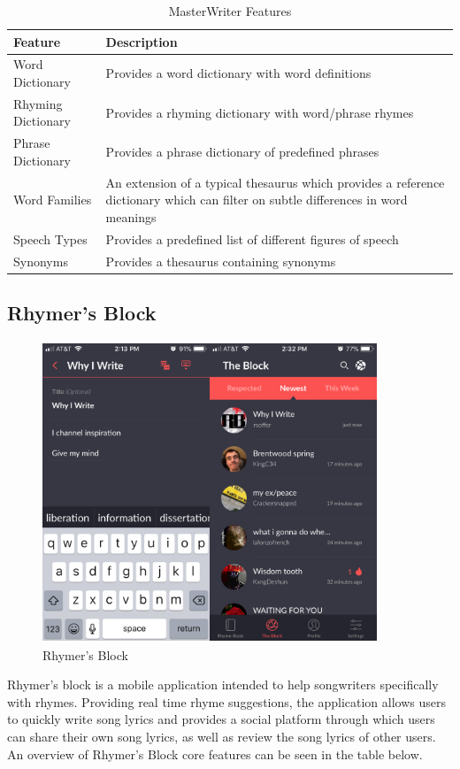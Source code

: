 \begin{table}[ht]
	\caption{MasterWriter Features}
	\centering
	\begin{tabular}{ | l | p{10cm} |}
		\hline
		\textbf{Feature} & \textbf{Description}\\ \hline
		Word Dictionary & Provides a word dictionary with word
		definitions \\ \hline
		Rhyming Dictionary & Provides a rhyming dictionary with
		word/phrase rhymes \\ \hline
		Phrase Dictionary & Provides a phrase dictionary of predefined
		phrases \\ \hline
		Word Families & An extension of a typical thesaurus which
		provides a reference dictionary which can
		filter on subtle differences in word
		meanings \\ \hline
		Speech Types & Provides a predefined list of different
		figures of speech \\ \hline
		Synonyms & Provides a thesaurus containing
		synonyms\\ \hline
	\end{tabular}
	\label{Tab:MasterWriter}
\end{table}

\noindent
\newline
\subsection{Rhymer's Block}

\begin{figure}[h]
	\includegraphics[width=10cm, height=9cm]{./figures/fig10}
	\centering
	\caption{Rhymer's Block}
	\label{fig:fig10}
\end{figure}
\noindent
\newline
Rhymer's block is a mobile application intended to help songwriters specifically with rhymes. Providing real time rhyme suggestions, the application allows users to quickly write song lyrics and provides a social platform through which users can share their own song lyrics, as well as review the song lyrics of other users. An overview of Rhymer's Block core features can be seen in the table below.

